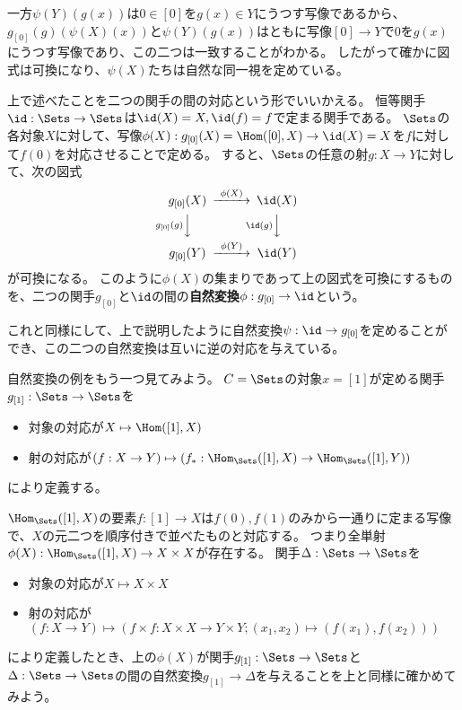 \documentclass[uplatex]{jsarticle}
\begin{document}
一方$\psi(Y)(g(x))$は$0 \in [0]$を$g(x) \in Y$にうつす写像であるから、$g_{[0]}(g)(\psi(X)(x))$と$\psi(Y)(g(x))$はともに写像$[0] \to Y$で$0$を$g(x)$にうつす写像であり、この二つは一致することがわかる。
したがって確かに図式は可換になり、$\psi(X)$たちは自然な同一視を定めている。

\vspace{10pt}
上で述べたことを二つの関手の間の対応という形でいいかえる。
恒等関手$\id:\Sets\to \Sets$は$\id(X)=X, \id(f)=f$で定まる関手である。
$\Sets$の各対象$X$に対して、写像$\phi(X):g_{[0]}(X)=\Hom([0],X) \to \id(X)=X$を$f$に対して$f(0)$を対応させることで定める。
すると、$\Sets$の任意の射$g:X \to Y$に対して、次の図式
\[
\begin{CD}
g_{[0]}(X)@>\phi(X)>>\id(X)\\
@Vg_{[0]}(g)VV@V\id(g)VV\\
g_{[0]}(Y)@>\phi(Y)>>\id(Y)
\end{CD}
\]
が可換になる。
このように$\phi(X)$の集まりであって上の図式を可換にするものを、二つの関手$g_{[0]}$と$\id$の間の\textbf{自然変換}$\phi:g_{[0]} \to \id$という。

これと同様にして、上で説明したように自然変換$\psi:\id \to g_{[0]}$を定めることができ、この二つの自然変換は互いに逆の対応を与えている。

\vspace{10pt}

自然変換の例をもう一つ見てみよう。
$C=\Sets$の対象$x=[1]$が定める関手$g_{[1]}:\Sets \to \Sets$を
\begin{itemize}
\item 対象の対応が$X \mapsto \Hom([1], X)$
\item 射の対応が$(f:X \to Y) \mapsto (f_*:\Hom_{\Sets}([1],X) \to \Hom_{\Sets}([1],Y))$
\end{itemize}
により定義する。

$\Hom_{\Sets}([1],X)$の要素$f:[1] \to X$は$f(0), f(1)$のみから一通りに定まる写像で、$X$の元二つを順序付きで並べたものと対応する。
つまり全単射$\phi(X):\Hom_{\Sets}([1],X) \to X \times X$が存在する。
関手$\Delta:\Sets \to \Sets$を
\begin{itemize}
\item 対象の対応が$X \mapsto X \times X$
\item 射の対応が$(f:X \to Y) \mapsto (f\times f:X \times X \to Y\times Y;(x_1,x_2) \mapsto (f(x_1),f(x_2)))$
\end{itemize}
により定義したとき、上の$\phi(X)$が関手$g_{[1]}:\Sets \to \Sets$と$\Delta:\Sets \to \Sets$の間の自然変換$g_{[1]} \to \Delta$を与えることを上と同様に確かめてみよう。
\end{document}
